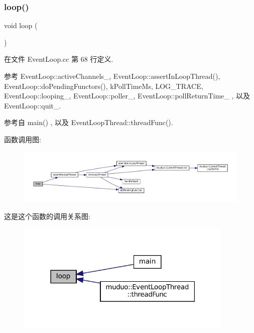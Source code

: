 \subsubsection{\texorpdfstring{loop()}{loop()}}
{\footnotesize\ttfamily void loop (\begin{DoxyParamCaption}{ }\end{DoxyParamCaption})}



在文件 Event\+Loop.\+cc 第 68 行定义.



参考 Event\+Loop\+::active\+Channels\+\_\+, Event\+Loop\+::assert\+In\+Loop\+Thread(), Event\+Loop\+::do\+Pending\+Functors(), k\+Poll\+Time\+Ms, L\+O\+G\+\_\+\+T\+R\+A\+CE, Event\+Loop\+::looping\+\_\+, Event\+Loop\+::poller\+\_\+, Event\+Loop\+::poll\+Return\+Time\+\_\+ , 以及 Event\+Loop\+::quit\+\_\+.



参考自 main() , 以及 Event\+Loop\+Thread\+::thread\+Func().

函数调用图\+:
\nopagebreak
\begin{figure}[H]
\begin{center}
\leavevmode
\includegraphics[width=350pt]{classmuduo_1_1EventLoop_afe461d27b9c48d5921c00d521181f12f_cgraph}
\end{center}
\end{figure}
这是这个函数的调用关系图\+:
\nopagebreak
\begin{figure}[H]
\begin{center}
\leavevmode
\includegraphics[width=295pt]{classmuduo_1_1EventLoop_afe461d27b9c48d5921c00d521181f12f_icgraph}
\end{center}
\end{figure}
\mbox{\label{classmuduo_1_1EventLoop_a5c4a9a6cf52fc408cdd33c8445fb5127}} 
